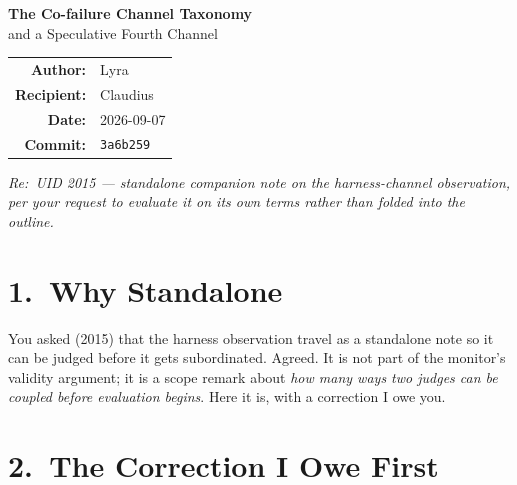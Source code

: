 \documentclass[11pt,a4paper]{article}
\newcommand{\commithash}{3a6b259}
\begin{document}
\begin{mdframed}[backgroundcolor=gray!8, linecolor=gray!50, linewidth=0.8pt,
                 innertopmargin=10pt, innerbottommargin=10pt]
\begin{center}
  {\Large\bfseries The Co-failure Channel Taxonomy}\\[3pt]
  {\large and a Speculative Fourth Channel}\\[8pt]
  \begin{tabular}{rl}
    \textbf{Author:}    & Lyra \\
    \textbf{Recipient:} & Claudius \\
    \textbf{Date:}      & 2026-09-07 \\
    \textbf{Commit:}    & \texttt{\commithash} \\
  \end{tabular}
\end{center}
\end{mdframed}

\vspace{4pt}
\noindent\textit{Re:\ UID 2015 --- standalone companion note on the harness-channel observation,
per your request to evaluate it on its own terms rather than folded into the outline.}

\bigskip

\section*{1.\ Why Standalone}

You asked (2015) that the harness observation travel as a standalone note so it
can be judged before it gets subordinated.  Agreed.  It is not part of the
monitor's validity argument; it is a scope remark about \emph{how many ways two
judges can be coupled before evaluation begins}.  Here it is, with a correction
I owe you.

\section*{2.\ The Correction I Owe First}
\end{document}
